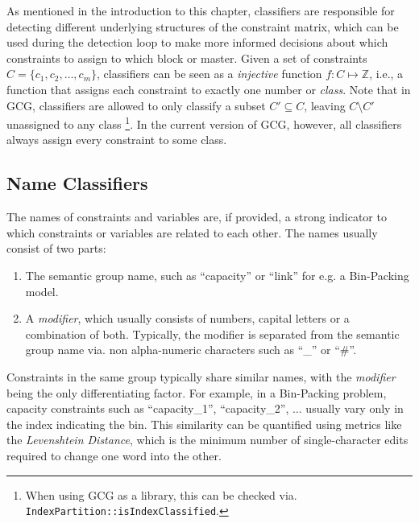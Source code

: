 		As mentioned in the introduction to this chapter, classifiers are responsible for detecting different underlying structures of the constraint matrix, which can be used during the detection loop to make more informed decisions about which constraints to assign to which block or master.
		Given a set of constraints $C = \{ c_1, c_2, \ldots, c_m \}$, classifiers can be seen as a \textit{injective} function $f: C \mapsto \mathbb{Z}$, i.e., a function that assigns each constraint to exactly one number or \textit{class}.
		Note that in \acs{GCG}, classifiers are allowed to only classify a subset $C' \subseteq C$, leaving $C \setminus C'$ unassigned to any class \footnote{When using \ac{GCG} as a library, this can be checked via. \lstinline|IndexPartition::isIndexClassified|.}.
		In the current version of \ac{GCG}, however, all classifiers always assign every constraint to some class.
		
		\subsection{Name Classifiers}
		
			The names of constraints and variables are, if provided, a strong indicator to which constraints or variables are related to each other.
			The names usually consist of two parts:
			\begin{enumerate}
				\item The semantic group name, such as \enquote{capacity} or \enquote{link} for e.g. a Bin-Packing model. 
				\item A \textit{modifier}, which usually consists of numbers, capital letters or a combination of both. Typically, the modifier is separated from the semantic group name via.  non alpha-numeric characters such as \enquote{\_} or \enquote{\#}.
			\end{enumerate}
		
			Constraints in the same group typically share similar names, with the \textit{modifier} being the only differentiating factor. For example, in a Bin-Packing problem, capacity constraints such as \enquote{capacity\_1}, \enquote{capacity\_2}, $\ldots$ usually vary only in the index indicating the bin. This similarity can be quantified using metrics like the \textit{Levenshtein Distance}, which is the minimum number of single-character edits required to change one word into the other.
			
